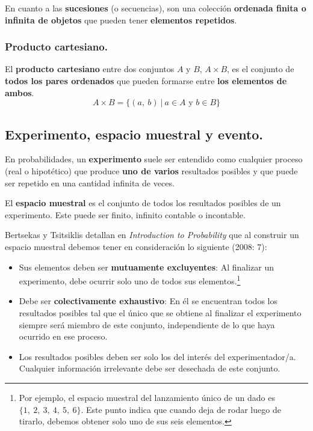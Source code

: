 \documentclass[12pt]{article}
\begin{document}
En cuanto a las \textbf{sucesiones} (o secuencias), son una colección \textbf{ordenada finita o infinita de objetos} que pueden tener \textbf{elementos repetidos}.

\subsubsection{Producto cartesiano.}

El \textbf{producto cartesiano} entre dos conjuntos $A$ y $B$, $A \times B$, es el conjunto de \textbf{todos los pares ordenados} que pueden formarse entre \textbf{los elementos de ambos}.
\[
  A \times B = \{(a, \ b) \ | \ a \in A \text{ y } b \in B\}
\]

\subsection{Experimento, espacio muestral y evento.}

En probabilidades, un \textbf{experimento} suele ser entendido como cualquier proceso (real o hipotético) que produce \textbf{uno de varios} resultados posibles y que puede ser repetido en una cantidad infinita de veces.

El \textbf{espacio muestral} es el conjunto de todos los resultados posibles de un experimento. Este puede ser finito, infinito contable o incontable.

Bertsekas y Tsitsiklis detallan en \textit{Introduction to Probability} que al construir un espacio muestral debemos tener en consideración lo siguiente (2008: 7):

\begin{itemize}
\item Sus elementos deben ser \textbf{mutuamente excluyentes}: Al finalizar un experimento, debe ocurrir solo uno de todos sus elementos.\footnote{Por ejemplo, el espacio muestral del lanzamiento único de un dado es $\{1, \ 2, \ 3, \ 4, \ 5, \ 6\}$. Este punto indica que cuando deja de rodar luego de tirarlo, debemos obtener solo uno de sus seis elementos.}

\item Debe ser \textbf{colectivamente exhaustivo}: En él se encuentran todos los resultados posibles tal que el único que se obtiene al finalizar el experimento siempre será miembro de este conjunto, independiente de lo que haya ocurrido en ese proceso.

\item Los resultados posibles deben ser solo los del interés del experimentador/a. Cualquier información irrelevante debe ser desechada de este conjunto.
\end{itemize}
\end{document}
